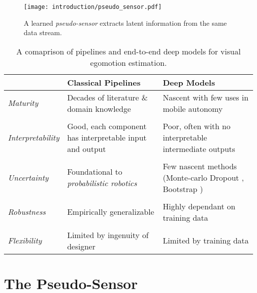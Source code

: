\begin{figure}
\begin{center}
		\texttt{[image: introduction/pseudo\_sensor.pdf]}
		\caption{A learned \textit{pseudo-sensor} extracts latent information from the same data stream.}
  	\label{fig:intro_pseudo_sensor}
\end{center}
\end{figure}


\begin{table}[h!]
	\caption{A comaprison of pipelines and end-to-end deep models for visual egomotion estimation.}
	\begin{threeparttable}
	\begin{tabular}{m{}m{}m{}}
		\toprule
		& \textbf{Classical Pipelines} & \textbf{Deep Models} \\ \midrule  
		\textit{Maturity} & Decades of literature \& domain knowledge & Nascent with few uses in mobile autonomy \\
		& & \\
		\textit{Interpretability} & Good, each component has interpretable input and output & Poor, often with no interpretable intermediate outputs \\
		& & \\
		\textit{Uncertainty} & Foundational to \textit{probabilistic robotics} & Few nascent methods (Monte-carlo Dropout \citep{Gal2016-ny}, Bootstrap \citep{Osband2016})  \\
		& & \\
		\textit{Robustness} & Empirically generalizable \citep{Zhou2019-se} & Highly dependant on training data\\
		& & \\
		\textit{Flexibility} & Limited by ingenuity of designer & Limited by training data \\
		\bottomrule
	\end{tabular}
\end{threeparttable}
\label{tab:intro_classical_vs_deep}
\end{table}

\section{The Pseudo-Sensor}

